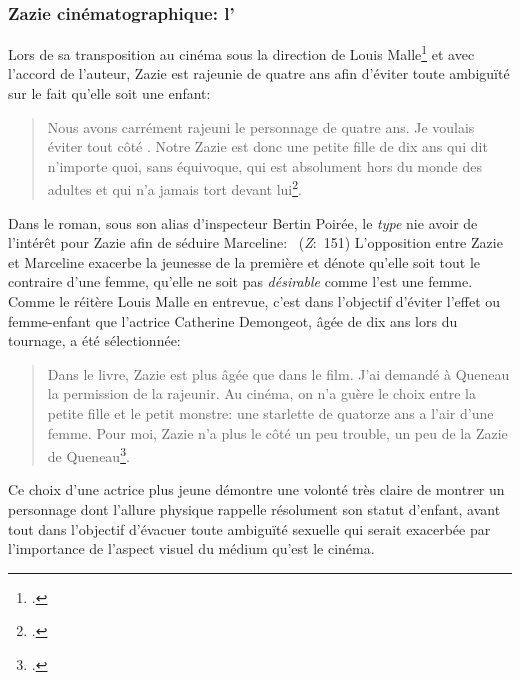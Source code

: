 \subsubsection{Zazie cinématographique: l'}
Lors de sa transposition au cinéma sous la direction de Louis Malle\footcite{Malle1960} et avec l'accord de l'auteur, Zazie est rajeunie de quatre ans afin d'éviter toute ambiguïté sur le fait qu'elle soit une enfant:
\begin{quote}
  \begin{singlespace}
    \small
    Nous avons carrément rajeuni le personnage de quatre ans. Je voulais éviter tout côté . Notre Zazie est donc une petite fille de dix ans qui dit n'importe quoi, sans équivoque, qui est absolument hors du monde des adultes et qui n'a jamais tort devant lui\footcite{Gilson1960}.
    \normalsize
  \end{singlespace}
\end{quote}
Dans le roman, sous son alias d'inspecteur Bertin Poirée, le \textit{type} nie avoir de l'intérêt pour Zazie afin de séduire Marceline: ~(\textit{Z}:~151)
L'opposition entre Zazie et Marceline exacerbe la jeunesse de la première et dénote qu'elle soit tout le contraire d'une femme, qu'elle ne soit pas \textit{désirable} comme l'est une femme.
Comme le réitère Louis Malle en entrevue, c'est dans l'objectif d'éviter l'effet  ou femme-enfant que l'actrice Catherine Demongeot, âgée de dix ans lors du tournage, a été sélectionnée:
\begin{quote}
  \begin{singlespace}
    \small
    Dans le livre, Zazie est plus âgée que dans le film. J'ai demandé à Queneau la permission de la rajeunir. Au cinéma, on n'a guère le choix entre la petite fille et le petit monstre: une starlette de quatorze ans a l'air d'une femme. Pour moi, Zazie n'a plus le côté un peu trouble, un peu  de la Zazie de Queneau\footcite[227]{Bigot1994}.
    \normalsize
  \end{singlespace}
\end{quote}
Ce choix d'une actrice plus jeune démontre une volonté très claire de montrer un personnage dont l'allure physique rappelle résolument son statut d'enfant, avant tout dans l'objectif d'évacuer toute ambiguïté sexuelle qui serait exacerbée par l'importance de l'aspect visuel du médium qu'est le cinéma.

